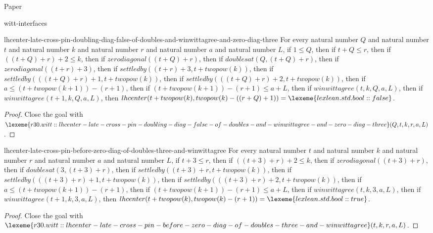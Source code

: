 \begin{lexlean}{Paper}
\begin{section}{witt-interfaces}
  \begin{theorem}{lhcenter-late-cross-pin-doubling-diag-false-of-doubles-and-winwittagree-and-zero-diag-three}
  For every natural number \(Q\) and natural number \(t\) and natural number \(k\) and natural number \(r\) and natural number \(a\) and natural number \(L\), if \(1 ≤ Q\), then if \(t + Q ≤ r\), then if \(((t + Q) + r) + 2 ≤ k\), then if \(zerodiagonal((t + Q) + r)\), then if \(doublesat(Q, (t + Q) + r)\), then if \(zerodiagonal((t + r) + 3)\), then if \(settledby((t + r) + 3, t + twopow(k))\), then if \(settledby(((t + Q) + r) + 1, t + twopow(k))\), then if \(settledby(((t + Q) + r) + 2, t + twopow(k))\), then if \(a ≤ (t + twopow(k + 1)) - (r + 1)\), then if \((t + twopow(k + 1)) - (r + 1) ≤ a + L\), then if \(winwittagree(t, k, Q, a, L)\), then if \(winwittagree(t + 1, k, Q, a, L)\), then \(lhcenter(t + twopow(k), twopow(k) - ((r + Q) + 1)) = \lexeme{lexlean.std.bool::false}\).
  \begin{proof}
  Close the goal with \(\lexeme{r30.witt::lhcenter-late-cross-pin-doubling-diag-false-of-doubles-and-winwittagree-and-zero-diag-three}(Q, t, k, r, a, L)\).
  \end{proof}
  \end{theorem}

  \begin{theorem}{lhcenter-late-cross-pin-before-zero-diag-of-doubles-three-and-winwittagree}
  For every natural number \(t\) and natural number \(k\) and natural number \(r\) and natural number \(a\) and natural number \(L\), if \(t + 3 ≤ r\), then if \(((t + 3) + r) + 2 ≤ k\), then if \(zerodiagonal((t + 3) + r)\), then if \(doublesat(3, (t + 3) + r)\), then if \(settledby((t + 3) + r, t + twopow(k))\), then if \(settledby(((t + 3) + r) + 1, t + twopow(k))\), then if \(settledby(((t + 3) + r) + 2, t + twopow(k))\), then if \(a ≤ (t + twopow(k + 1)) - (r + 1)\), then if \((t + twopow(k + 1)) - (r + 1) ≤ a + L\), then if \(winwittagree(t, k, 3, a, L)\), then if \(winwittagree(t + 1, k, 3, a, L)\), then \(lhcenter(t + twopow(k), twopow(k) - (r + 1)) = \lexeme{lexlean.std.bool::true}\).
  \begin{proof}
  Close the goal with \(\lexeme{r30.witt::lhcenter-late-cross-pin-before-zero-diag-of-doubles-three-and-winwittagree}(t, k, r, a, L)\).
  \end{proof}
  \end{theorem}


\end{section}
\end{lexlean}
